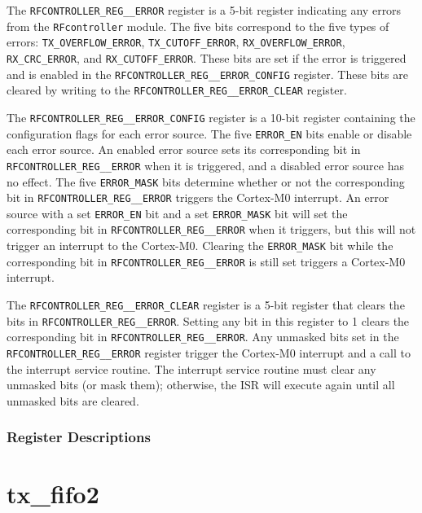 The \texttt{RFCONTROLLER\_REG\_\_ERROR} register is a 5-bit register indicating any errors from the \texttt{RFcontroller} module. The five bits correspond to the five types of errors: \texttt{TX\_OVERFLOW\_ERROR}, \texttt{TX\_CUTOFF\_ERROR}, \texttt{RX\_OVERFLOW\_ERROR}, \texttt{RX\_CRC\_ERROR}, and \texttt{RX\_CUTOFF\_ERROR}. These bits are set if the error is triggered and is enabled in the \texttt{RFCONTROLLER\_REG\_\_ERROR\_CONFIG} register. These bits are cleared by writing to the \texttt{RFCONTROLLER\_REG\_\_ERROR\_CLEAR} register.

The \texttt{RFCONTROLLER\_REG\_\_ERROR\_CONFIG} register is a 10-bit register containing the configuration flags for each error source. The five \texttt{ERROR\_EN} bits enable or disable each error source. An enabled error source sets its corresponding bit in \texttt{RFCONTROLLER\_REG\_\_ERROR} when it is triggered, and a disabled error source has no effect. The five \texttt{ERROR\_MASK} bits determine whether or not the corresponding bit in \texttt{RFCONTROLLER\_REG\_\_ERROR} triggers the Cortex-M0 interrupt. An error source with a set \texttt{ERROR\_EN} bit and a set \texttt{ERROR\_MASK} bit will set the corresponding bit in \texttt{RFCONTROLLER\_REG\_\_ERROR} when it triggers, but this will not trigger an interrupt to the Cortex-M0. Clearing the \texttt{ERROR\_MASK} bit while the corresponding bit in \texttt{RFCONTROLLER\_REG\_\_ERROR} is still set triggers a Cortex-M0 interrupt. 

The \texttt{RFCONTROLLER\_REG\_\_ERROR\_CLEAR} register is a 5-bit register that clears the bits in \texttt{RFCONTROLLER\_REG\_\_ERROR}. Setting any bit in this register to 1 clears the corresponding bit in \texttt{RFCONTROLLER\_REG\_\_ERROR}. Any unmasked bits set in the \texttt{RFCONTROLLER\_REG\_\_ERROR} register trigger the Cortex-M0 interrupt and a call to the interrupt service routine. The interrupt service routine must clear any unmasked bits (or mask them); otherwise, the ISR will execute again until all unmasked bits are cleared.

\subsubsection{Register Descriptions}

\section{tx\_fifo2} \label{tx-fifo}
